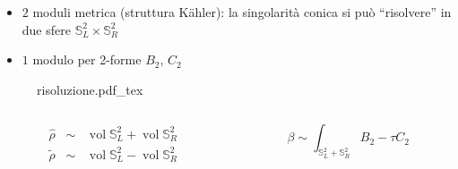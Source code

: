 \documentclass[aspectratio=43,mathserif]{beamer}
\newcommand{\ess}{\mathbb{S}}
\newcommand{\hatt}[1]{\ensuremath{\widehat{#1}}}
\newcommand{\tildd}[1]{\ensuremath{\widetilde{#1}}}
\newcommand{\vol}{\ensuremath{\operatorname{vol}}}
\begin{document}
\begin{frame}
	\begin{itemize}
		\item	$2$ moduli metrica (struttura K\"ahler): la singolarità conica si può ``risolvere'' in due sfere $\ess^2_L \times \ess^2_R$\\
			\vfill
		\item	$1$ modulo per 2-forme $B_2$, $C_2$
	\end{itemize}
	\vspace{-15pt}

	\begin{figure}[h!]\centering
		\def\svgscale{0.5}
		{risoluzione.pdf_tex}
	\end{figure}

	\vspace{-35pt}

	\begin{columns}
		\begin{column}{0.5\textwidth}

			\begin{align}
				\hatt\rho \;\; \sim\;\;  \vol \ess^2_L + \vol \ess^2_R\\
				\tildd\rho \;\; \sim\;\;  \vol \ess^2_L - \vol \ess^2_R
			\end{align}
		\end{column}
		\begin{column}{0.5\textwidth}
			\vfill
			\vspace{10pt}
			\begin{equation}
				\beta \sim \int_{\ess_L^2 + \ess_R^2} B_2 - \tau C_2
				\label{}
			\end{equation}
		\end{column}
	\end{columns}
\end{frame}
\end{document}
